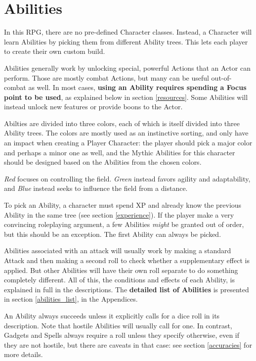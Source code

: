 
\chapter{Abilities}

In this RPG, there are no pre-defined Character classes. Instead, a Character will learn Abilities by picking them from different Ability trees. This lets each player to create their own custom build.

Abilities generally work by unlocking special, powerful Actions that an Actor can perform. Those are mostly combat Actions, but many can be useful out-of-combat as well. In most cases, \textbf{using an Ability requires spending a Focus point to be used}, as explained below in section \ref{resources}. Some Abilities will instead unlock new features or provide boons to the Actor.

\label{abilities}

Abilties are divided into three colors, each of which is itself divided into three Ability trees. The colors are mostly used as an instinctive sorting, and only have an impact when creating a Player Character: the player should pick a major color and perhaps a minor one as well, and the Mythic Abilities for this character should be designed based on the Abilities from the chosen colors. 

\textit{Red} focuses on controlling the field. \textit{Green} instead favors agility and adaptability, and \textit{Blue} instead seeks to influence the field from a distance.

To pick an Ability, a character must spend XP and already know the previous Ability in the same tree (see section \ref{experience}). If the player make a very convincing roleplaying argument, a few Abilities \textit{might} be granted out of order, but this should be an exception. The first Ability can always be picked.

Abilities associated with an attack will usually work by making a standard Attack and then making a second roll to check whether a supplementary effect is applied. But other Abilities will have their own roll separate to do something completely different. All of this, the conditions and effects of each Ability, is explained in full in the descriptions. The \textbf{detailed list of Abilities} is presented in section \ref{abilities_list}, in the Appendices. 

An Ability always succeeds unless it explicitly calls for a dice roll in its description. Note that hostile Abilities will usually call for one. In contrast, Gadgets and Spells always require a roll unless they specify otherwise, even if they are not hostile, but there are caveats in that case: see section \ref{accuracies} for more details.



